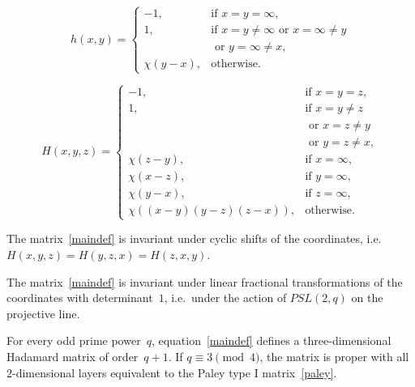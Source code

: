 \documentclass[10pt,a4paper]{amsart}
\begin{document}
\begin{equation}\label{paley}
h(x,y)=\left\{\begin{array}{ll}
-1, & \mbox{if } x=y=\infty,\\
1, & \mbox{if } x=y\neq \infty \mbox{ or } x=\infty\neq y \\
 & \mbox{ or } y=\infty\neq x,\\
\chi(y-x), & \mbox{otherwise.}
\end{array}\right.
\end{equation}

\begin{equation}\label{maindef}
H(x,y,z)=\left\{\begin{array}{ll}
-1, & \mbox{if } x=y=z,\\
1, & \mbox{if } x=y\neq z\\
 & \mbox{ or } x=z\neq y\\
 & \mbox{ or } y=z\neq x,\\
\chi(z-y), & \mbox{if } x=\infty,\\
\chi(x-z), & \mbox{if } y=\infty,\\
\chi(y-x), & \mbox{if } z=\infty,\\
\chi((x-y)(y-z)(z-x)), & \mbox{otherwise.}
\end{array}\right.
\end{equation}

\begin{lemma}\label{lm1}
The matrix~\eqref{maindef} is invariant under cyclic shifts of the coordinates,
i.e.\ $H(x,y,z)=H(y,z,x)=H(z,x,y)$.
\end{lemma}

\begin{lemma}\label{lm2}
The matrix~\eqref{maindef} is invariant under linear fractional transformations
of the coordinates with determinant~$1$, i.e.\ under the action of $PSL(2,q)$ on
the projective line.
\end{lemma}

\begin{theorem}\label{maintm}
For every odd prime power~$q$, equation~\eqref{maindef} defines a three-dimensional Hadamard
matrix of order~$q+1$. If $q\equiv 3 \pmod{4}$, the matrix is proper with all $2$-dimensional
layers equivalent to the Paley type I matrix~\eqref{paley}.
\end{theorem}
\end{document}
